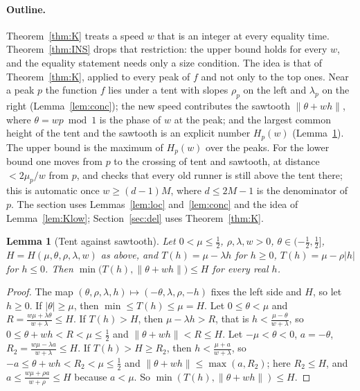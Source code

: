 \documentclass[11pt]{article}
\newtheorem{lemma}[theorem]{Lemma}
\theoremstyle{definition}
\theoremstyle{remark}
\newcommand{\nd}[1]{\lVert #1\rVert}
\begin{document}
\paragraph{Outline.}
Theorem~\ref{thm:K} treats a speed $w$ that is an integer at every equality time. Theorem~\ref{thm:INS} drops that restriction: the upper bound holds for every $w$, and the equality statement needs only a size condition. The idea is that of Theorem~\ref{thm:K}, applied to every peak of $f$ and not only to the top ones. Near a peak $p$ the function $f$ lies under a tent with slopes $\rho_p$ on the left and $\lambda_p$ on the right (Lemma~\ref{lem:conc}); the new speed contributes the sawtooth $\nd{\theta+wh}$, where $\theta=wp\bmod1$ is the phase of $w$ at the peak; and the largest common height of the tent and the sawtooth is an explicit number $H_p(w)$ (Lemma~\ref{lem:Hcap}). The upper bound is the maximum of $H_p(w)$ over the peaks. For the lower bound one moves from $p$ to the crossing of tent and sawtooth, at distance $<2\mu_p/w$ from $p$, and checks that every old runner is still above the tent there; this is automatic once $w\ge(d-1)M$, where $d\le2M-1$ is the denominator of $p$. The section uses Lemmas~\ref{lem:loc} and~\ref{lem:conc} and the idea of Lemma~\ref{lem:Klow}; Section~\ref{sec:del} uses Theorem~\ref{thm:K}.

\begin{lemma}[Tent against sawtooth]\label{lem:Hcap}
Let $0<\mu\le\frac12$, $\rho,\lambda,w>0$, $\theta\in(-\frac12,\frac12]$, $H=H(\mu,\theta,\rho,\lambda,w)$ as above, and $T(h)=\mu-\lambda h$ for $h\ge0$, $T(h)=\mu-\rho|h|$ for $h\le0$. Then $\min\bigl(T(h),\nd{\theta+wh}\bigr)\le H$ for every real $h$.
\end{lemma}
\begin{proof}
The map $(\theta,\rho,\lambda,h)\mapsto(-\theta,\lambda,\rho,-h)$ fixes the left side and $H$, so let $h\ge0$. If $|\theta|\ge\mu$, then $\min\le T(h)\le\mu=H$. Let $0\le\theta<\mu$ and $R=\frac{w\mu+\lambda\theta}{w+\lambda}\le H$. If $T(h)>H$, then $\mu-\lambda h>R$, that is $h<\frac{\mu-\theta}{w+\lambda}$, so $0\le\theta+wh<R<\mu\le\frac12$ and $\nd{\theta+wh}<R\le H$. Let $-\mu<\theta<0$, $a=-\theta$, $R_2=\frac{w\mu-\lambda a}{w+\lambda}\le H$. If $T(h)>H\ge R_2$, then $h<\frac{\mu+a}{w+\lambda}$, so $-a\le\theta+wh<R_2<\mu\le\frac12$ and $\nd{\theta+wh}\le\max(a,R_2)$; here $R_2\le H$, and $a\le\frac{w\mu+\rho a}{w+\rho}\le H$ because $a<\mu$. So $\min(T(h),\nd{\theta+wh})\le H$.
\end{proof}
\end{document}
